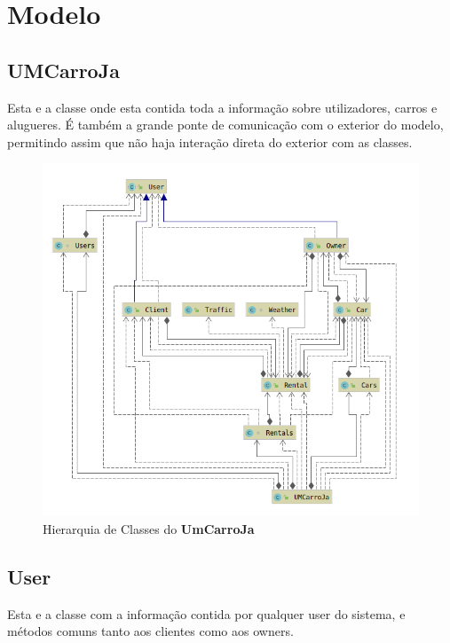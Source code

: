 \documentclass[a4paper]{report}
\begin{document}
\section{Modelo}

\subsection{UMCarroJa}

Esta e a classe onde esta contida toda a informação sobre utilizadores,
carros e alugueres. É também a grande ponte de comunicação com o exterior
do modelo, permitindo assim que não haja interação direta do exterior com
as classes.

\begin{figure}[h]
    \centering
    \includegraphics[scale=0.5]{hierarquiaUmCarroJa.png}
    \caption{Hierarquia de Classes do \textbf{UmCarroJa}}\label{fig:hUCJ}
\end{figure}


\subsection{User}

Esta e a classe com a informação contida por qualquer user do sistema,
e métodos comuns tanto aos clientes como aos owners.
\end{document}
